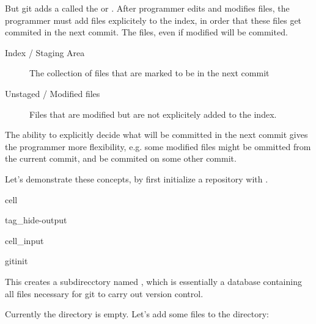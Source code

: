 \documentclass[a4paper,10pt,english]{jupyterBook}
\begin{document}
\sphinxAtStartPar
But git adds a  called the  or . After programmer edits and modifies files, the programmer must add files explicitely to the index, in order that these files get commited in the next commit. The  files, even if modified will  be commited.
\begin{description}
\item[{Index / Staging Area}] \leavevmode
\sphinxAtStartPar
The collection of files that are marked to be  in the next commit

\item[{Unstaged / Modified files}] \leavevmode
\sphinxAtStartPar
Files that are modified but are not explicitely added to the index.

\end{description}

\sphinxAtStartPar
The ability to explicitly decide what will be committed in the next commit gives the programmer more flexibility, e.g. some modified files might be ommitted from the current commit, and be commited on some other commit.

\sphinxAtStartPar
Let’s demonstrate these concepts, by first initialize a repository with .

\begin{sphinxuseclass}{cell}
\begin{sphinxuseclass}{tag_hide-output}\begin{sphinxVerbatimInput}

\begin{sphinxuseclass}{cell_input}
\begin{sphinxVerbatim}[commandchars=\\\{\}]
gitinit
\end{sphinxVerbatim}

\end{sphinxuseclass}\end{sphinxVerbatimInput}

\end{sphinxuseclass}
\end{sphinxuseclass}
\sphinxAtStartPar
This creates a subdirecctory named , which is essentially a database containing all files necessary for git to carry out version control.

\sphinxAtStartPar
Currently the directory is empty. Let’s add some files to the directory:
\end{document}
